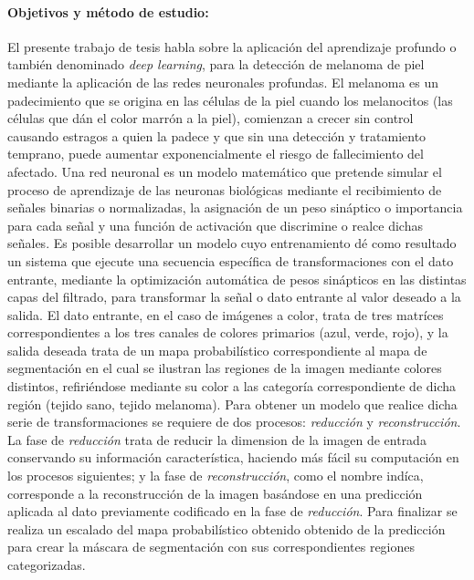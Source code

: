 {\paragraph{Objetivos y método de estudio:}
El presente trabajo de tesis habla sobre la aplicación del aprendizaje profundo o también denominado \emph{deep learning}, para la detección de melanoma de piel mediante la aplicación de las redes neuronales profundas.
El melanoma es un padecimiento que se origina en las células de la piel cuando los melanocitos (las células que dán el color marrón a la piel), comienzan a crecer sin control causando estragos a quien la padece y que sin una detección y tratamiento temprano, puede aumentar exponencialmente el riesgo de fallecimiento del afectado.
Una red neuronal es un modelo matemático que pretende simular el proceso de aprendizaje de las neuronas biológicas mediante el recibimiento de señales binarias o normalizadas, la asignación de un peso sináptico o importancia para cada señal y una función de activación que discrimine o realce dichas señales. Es posible desarrollar un modelo cuyo entrenamiento dé como resultado un sistema que ejecute una secuencia específica de transformaciones con el dato entrante, mediante la optimización automática de pesos sinápticos en las distintas capas del filtrado, para transformar la señal o dato entrante al valor deseado a la salida. El dato entrante, en el caso de imágenes a color, trata de tres matríces correspondientes a los tres canales de colores primarios (azul, verde, rojo), y la salida deseada trata de un mapa probabilístico correspondiente al mapa de segmentación en el cual se ilustran las regiones de la imagen mediante colores distintos, refiriéndose mediante su color a las categoría correspondiente de dicha región (tejido sano, tejido melanoma). Para obtener un modelo que realice dicha serie de transformaciones se requiere de dos procesos: \emph{reducción} y \emph{reconstrucción}. La fase de \emph{reducción} trata de reducir la dimension de la imagen de entrada conservando su información característica, haciendo más fácil su computación en los procesos siguientes; y la fase de \emph{reconstrucción}, como el nombre indíca, corresponde a la reconstrucción de la imagen basándose en una predicción aplicada al dato previamente codificado en la fase de \emph{reducción}. Para finalizar se realiza un escalado del mapa probabilístico obtenido obtenido de la predicción para crear la máscara de segmentación con sus correspondientes regiones categorizadas.

}
